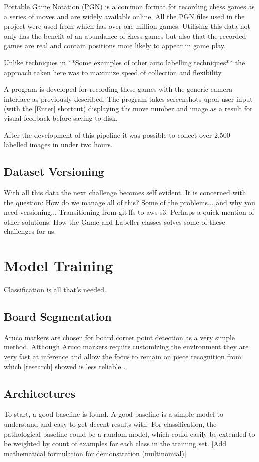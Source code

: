 Portable Game Notation (PGN) is a common format for recording chess games as a 
series of moves and are widely available online.  All the PGN files used in the 
project were used from \cite{} which has over one million games.  Utilising this
data not only has the benefit of an abundance of chess games but also that the 
recorded games are real and contain positions more likely to appear in game play. 

Unlike techniques in \cite{}  **Some examples of other auto labelling techniques**
the approach taken here was to maximize speed of collection and flexibility.

A program is developed for recording these games with the generic camera interface
as previously described.  The program takes screenshots upon user input (with the
[Enter] shortcut) displaying the move number and image as a result for visual feedback
before saving to disk.

After the development of this pipeline it was possible to collect over 2,500 labelled
images in under two hours.

\subsection{Dataset Versioning}
With all this data the next challenge becomes self evident.
It is concerned with the question: How do we manage all of this?
Some of the problems... and why you need versioning...
Transitioning from git lfs to aws s3.  Perhaps a quick mention of other solutions.
How the Game and Labeller classes solves some of these challenges for us.


\section{Model Training}
Classification is all that's needed.

\subsection{Board Segmentation}
Aruco markers are chosen for board corner point detection as a very simple method.
Although Aruco markers require customizing the environment they are very fast at 
inference and allow the focus to remain on piece recognition from which
\autoref{research} showed is less reliable \cite{}.

\subsection{Architectures}
To start, a good baseline is found.  A good baseline is a simple model to understand and easy to get decent results with.
For classification, the pathological baseline could be a random model, which could easily be extended to be weighted by 
count of examples for each class in the training set.  [Add mathematical formulation for demonstration (multinomial)]

